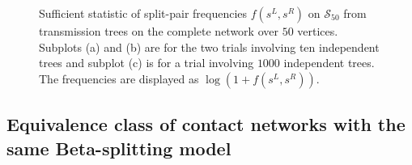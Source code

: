 \documentclass[review]{elsarticle}
\numberwithin{equation}{section}
\begin{document}
\begin{figure}[htbp]
\begin{center}
\begin {center}
\end{center}
\caption{Sufficient statistic of split-pair frequencies $f(s^L,s^R)$ on $\mathcal{S}_{50}$ from transmission trees on the complete network over $50$ vertices. 
Subplots (a) and (b) are for the two trials involving ten independent trees and subplot (c) is for a trial involving $1000$ independent trees.  
The frequencies are displayed as $\log(1+f(s^L,s^R))$.\label{F:SuffStatsCompleteGraph_n50_reps10}}
\end{center}
\end{figure}

\subsection{Equivalence class of contact networks with the same Beta-splitting model}\label{S:EquivClass}
\end{document}
